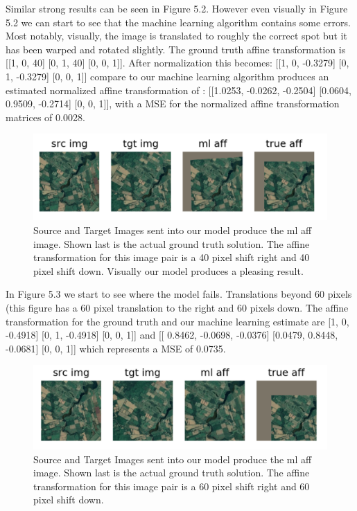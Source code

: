   Similar strong results can be seen in Figure 5.2. However even visually in Figure 5.2 we can start to see that the machine learning algorithm contains some errors. Most notably, visually, the image is translated to roughly the correct spot but it has been warped and rotated slightly. The ground truth affine transformation is [[1, 0, 40] [0, 1, 40] [0, 0, 1]]. After normalization this becomes: [[1, 0, -0.3279] [0, 1, -0.3279] [0, 0, 1]] compare to our machine learning algorithm produces an estimated normalized affine transformation of : [[1.0253, -0.0262, -0.2504] [0.0604, 0.9509, -0.2714] [0, 0, 1]],  with a MSE for the normalized affine transformation matrices of 0.0028.\\
\begin{figure}
\centering
\includegraphics[width = 5.0in]{figs/40_right_40_down}
\caption{Source and Target Images sent into our model produce the ml aff image. Shown last is the actual ground truth solution. The affine transformation for this image pair is a 40 pixel shift right and 40 pixel shift down. Visually our model produces a pleasing result.}
\end{figure}
  In Figure 5.3 we start to see where the model fails. Translations beyond 60 pixels (this figure has a 60 pixel translation to the right and 60 pixels down. The affine transformation for the ground truth and our machine learning estimate are [1, 0, -0.4918] [0, 1, -0.4918] [0, 0, 1]] and [[ 0.8462, -0.0698, -0.0376] [0.0479,  0.8448, -0.0681] [0, 0, 1]] which represents a MSE of 0.0735.
\begin{figure}
\centering
\includegraphics[width = 5.0in]{figs/60_right_60_down}
\caption{Source and Target Images sent into our model produce the ml aff image. Shown last is the actual ground truth solution. The affine transformation for this image pair is a 60 pixel shift right and 60 pixel shift down.}
\end{figure}


